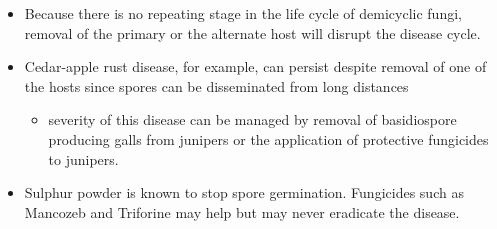 \documentclass[10pt,dvipsnames,ignorenonframetext,aspectratio=169]{beamer}
\providecommand{\tightlist}{%
  \setlength{\itemsep}{0pt}\setlength{\parskip}{0pt}}
\begin{document}
\begin{frame}{}
\protect\hypertarget{section-9}{}
\begin{itemize}
\tightlist
\item
  Because there is no repeating stage in the life cycle of demicyclic
  fungi, removal of the primary or the alternate host will disrupt the
  disease cycle.
\item
  Cedar-apple rust disease, for example, can persist despite removal of
  one of the hosts since spores can be disseminated from long distances

  \begin{itemize}
  \tightlist
  \item
    severity of this disease can be managed by removal of basidiospore
    producing galls from junipers or the application of protective
    fungicides to junipers.
  \end{itemize}
\item
  Sulphur powder is known to stop spore germination. Fungicides such as
  Mancozeb and Triforine may help but may never eradicate the disease.
\end{itemize}
\end{frame}
\end{document}
